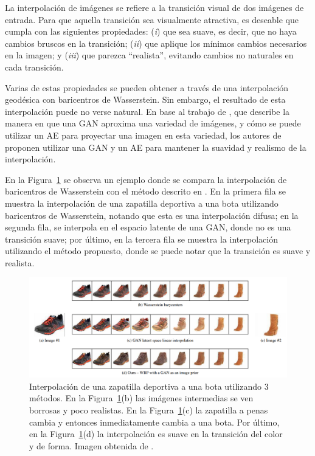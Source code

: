 La interpolación de imágenes se refiere a la transición visual de dos imágenes de entrada. Para que aquella transición sea visualmente atractiva, es deseable que cumpla con las siguientes propiedades: (\textit{i}) que sea suave, es decir, que no haya cambios bruscos en la transición; (\textit{ii}) que aplique los mínimos cambios necesarios en la imagen; y (\textit{iii}) que parezca ``realista'', evitando cambios no naturales en cada transición.

Varias de estas propiedades se pueden obtener a través de una interpolación geodésica con baricentros de Wasserstein. Sin embargo, el resultado de esta interpolación puede no verse natural.
En base al trabajo de \cite{zhu2016generative}, que describe la manera en que una GAN aproxima una variedad de imágenes, y cómo se puede utilizar un AE para proyectar una imagen en esta variedad, los autores de \cite{simon2020barycenters} proponen utilizar una GAN y un AE para mantener la suavidad y realismo de la interpolación.


En la Figura~\ref{fig:interpolacion-wass-bar-gan} se observa un ejemplo donde se compara la interpolación de baricentros de Wasserstein con el método descrito en \cite{simon2020barycenters}.
En la primera fila se muestra la interpolación de una zapatilla deportiva a una bota utilizando baricentros de Wasserstein, notando que esta es una interpolación difusa; en la segunda fila, se interpola en el espacio latente de una GAN, donde no es una transición suave; por último, en la tercera fila se muestra la interpolación utilizando el método propuesto, donde se puede notar que la transición es suave y realista.
\begin{figure}[H]
    \centering
    \includegraphics[width=\textwidth]{img/cbw/interpolacion-wass-bar-gan.png}
    \caption{
        Interpolación de una zapatilla deportiva a una bota utilizando 3 métodos. En la Figura~\ref{fig:interpolacion-wass-bar-gan}(b) las imágenes intermedias se ven borrosas y poco realistas. En la Figura~\ref{fig:interpolacion-wass-bar-gan}(c) la zapatilla a penas cambia y entonces inmediatamente cambia a una bota. Por último, en la Figura~\ref{fig:interpolacion-wass-bar-gan}(d) la interpolación es suave en la transición del color y de forma. Imagen obtenida de \cite{simon2020barycenters}.
    }
    \label{fig:interpolacion-wass-bar-gan}
\end{figure}

